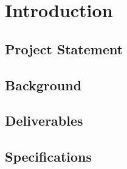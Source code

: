 \chapter{Introduction}

\blindtext

\section{Project Statement}

\Blindtext

\section{Background}

\Blindtext

\section{Deliverables}

\Blindtext

\section{Specifications}

\Blindtext
